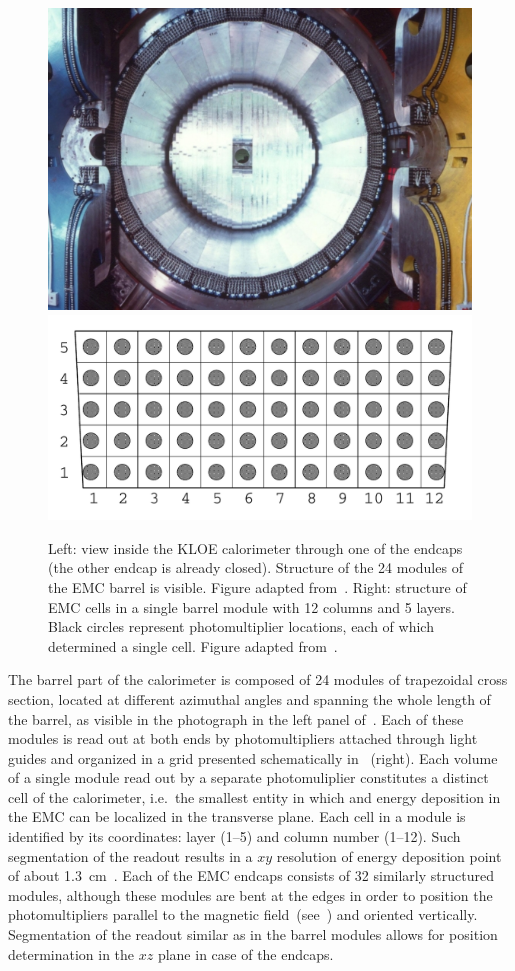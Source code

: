 \begin{figure}[h!]
  \centering
  \includegraphics[height=27ex]{Chapter3_detectors/img/emc2}
  \hspace{1em}
  \includegraphics[height=17ex]{Chapter3_detectors/img/emc_module}
  \caption{Left: view inside the KLOE calorimeter through one of the endcaps (the other endcap is already closed). Structure of the 24 modules of the EMC barrel is visible. Figure adapted from~\cite{kloe_web}. Right: structure of EMC cells in a single barrel module with 12 columns and 5 layers. Black circles represent photomultiplier locations, each of which determined a single cell. Figure adapted from~\cite{zdebik_mgr}.}
  \label{fig:emc}
\end{figure}

The barrel part of the calorimeter is composed of 24 modules of trapezoidal cross section, located at different azimuthal angles and spanning the whole length of the barrel, as visible in the photograph in the left panel of~. Each of these modules is read out at both ends by photomultipliers attached through light guides and organized in a grid presented schematically in~ (right). Each volume of a single module read out by a separate photomuliplier constitutes a distinct cell of the calorimeter, i.e.\ the smallest entity in which and energy deposition in the EMC can be localized in the transverse plane. Each cell in a module is identified by its coordinates: layer (1--5) and column number (1--12). Such segmentation of the readout results in a $xy$ resolution of energy deposition point of about 1.3~cm~\cite{Adinolfi:2002zx}. Each of the EMC endcaps consists of 32 similarly structured modules, although these modules are bent at the edges in order to position the photomultipliers parallel to the magnetic field~(see~) and oriented vertically. Segmentation of the readout similar as in the barrel modules allows for position determination in the $xz$ plane in case of the endcaps.

